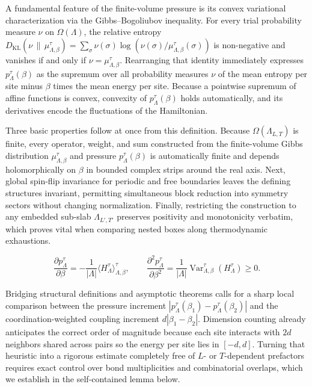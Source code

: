\documentclass[11pt]{article}
\theoremstyle{definition}
\begin{document}
A fundamental feature of the finite-volume pressure is its convex variational
characterization via the Gibbs--Bogoliubov inequality. For every trial probability
measure $\nu$ on $\Omega(\Lambda)$, the relative entropy $D_{\mathrm{KL}}(\nu \,\|\,
\mu_{\Lambda,\beta}^\tau) = \sum_\sigma \nu(\sigma)
\log(\nu(\sigma)/\mu_{\Lambda,\beta}^\tau(\sigma))$ is non-negative and vanishes if
and only if $\nu = \mu_{\Lambda,\beta}^\tau$. Rearranging that identity immediately
expresses $p_\Lambda^\tau(\beta)$ as the supremum over all probability measures
$\nu$ of the mean entropy per site minus $\beta$ times the mean energy per site.
Because a pointwise supremum of affine functions is convex, convexity of
$p_\Lambda^\tau(\beta)$ holds automatically, and its derivatives encode the
fluctuations of the Hamiltonian.

Three basic properties follow at once from this definition. Because
$\Omega(\Lambda_{L,T})$ is finite, every operator, weight, and sum constructed from
the finite-volume Gibbs distribution $\mu_{\Lambda,\beta}^\tau$ and pressure
$p_\Lambda^\tau(\beta)$ is automatically finite and depends holomorphically on
$\beta$ in bounded complex strips around the real axis. Next, global spin-flip
invariance for periodic and free boundaries leaves the defining structures
invariant, permitting simultaneous block reduction into symmetry sectors without
changing normalization. Finally, restricting the construction to any embedded
sub-slab $\Lambda_{L',T'}$ preserves positivity and monotonicity verbatim, which
proves vital when comparing nested boxes along thermodynamic exhaustions.

\[
  \frac{\partial p_\Lambda^\tau}{\partial \beta} = -\frac{1}{|\Lambda|} \langle H_\Lambda^\tau \rangle_{\Lambda,\beta}^\tau, \qquad \frac{\partial^2 p_\Lambda^\tau}{\partial \beta^2} = \frac{1}{|\Lambda|} \operatorname{Var}_{\Lambda,\beta}^\tau(H_\Lambda^\tau) \ge 0.
\]

Bridging structural definitions and asymptotic theorems calls for a sharp local
comparison between the pressure increment $|p_\Lambda^\tau(\beta_1) -
p_\Lambda^\tau(\beta_2)|$ and the coordination-weighted coupling increment $d
|\beta_1 - \beta_2|$. Dimension counting already anticipates the correct order of
magnitude because each site interacts with $2d$ neighbors shared across pairs so the
energy per site lies in $[-d, d]$. Turning that heuristic into a rigorous estimate
completely free of $L$- or $T$-dependent prefactors requires exact control over bond
multiplicities and combinatorial overlaps, which we establish in the self-contained
lemma below.
\end{document}
